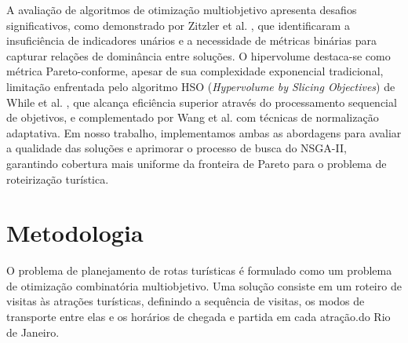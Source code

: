 \documentclass{pssbmac}
\begin{document}
A avaliação de algoritmos de otimização multiobjetivo apresenta desafios significativos, como demonstrado por Zitzler et al. \cite{Zitzler2003}, que identificaram a insuficiência de indicadores unários e a necessidade de métricas binárias para capturar relações de dominância entre soluções. O hipervolume destaca-se como métrica Pareto-conforme, apesar de sua complexidade exponencial tradicional, limitação enfrentada pelo algoritmo HSO (\textit{Hypervolume by Slicing Objectives}) de While et al. \cite{While2006}, que alcança eficiência superior através do processamento sequencial de objetivos, e complementado por Wang et al. \cite{Wang2023} com técnicas de normalização adaptativa. Em nosso trabalho, implementamos ambas as abordagens para avaliar a qualidade das soluções e aprimorar o processo de busca do NSGA-II, garantindo cobertura mais uniforme da fronteira de Pareto para o problema de roteirização turística.

\section{Metodologia}
O problema de planejamento de rotas turísticas é formulado como um problema de otimização combinatória multiobjetivo. Uma solução consiste em um roteiro de visitas às atrações turísticas, definindo a sequência de visitas, os modos de transporte entre elas e os horários de chegada e partida em cada atração.do Rio de Janeiro.
\end{document}
